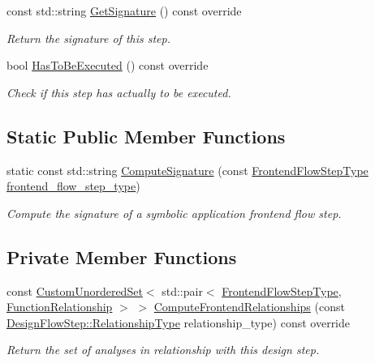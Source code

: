 \begin{DoxyCompactItemize}
const std\+::string \hyperlink{classSymbolicApplicationFrontendFlowStep_a556a719569a45bfc5f3554c1cc7558c3}{Get\+Signature} () const override
\begin{DoxyCompactList}\small\item\em Return the signature of this step. \end{DoxyCompactList}\item 
bool \hyperlink{classSymbolicApplicationFrontendFlowStep_a113fcb0dca5cdd6e2be02252be23b0e7}{Has\+To\+Be\+Executed} () const override
\begin{DoxyCompactList}\small\item\em Check if this step has actually to be executed. \end{DoxyCompactList}\end{DoxyCompactItemize}
\subsection*{Static Public Member Functions}
\begin{DoxyCompactItemize}
\item 
static const std\+::string \hyperlink{classSymbolicApplicationFrontendFlowStep_aedd0e776b99f86abc0f35695c0a423a3}{Compute\+Signature} (const \hyperlink{frontend__flow__step_8hpp_afeb3716c693d2b2e4ed3e6d04c3b63bb}{Frontend\+Flow\+Step\+Type} \hyperlink{classFrontendFlowStep_ad49067d6a17119d47316149ab757b60d}{frontend\+\_\+flow\+\_\+step\+\_\+type})
\begin{DoxyCompactList}\small\item\em Compute the signature of a symbolic application frontend flow step. \end{DoxyCompactList}\end{DoxyCompactItemize}
\subsection*{Private Member Functions}
\begin{DoxyCompactItemize}
\item 
const \hyperlink{classCustomUnorderedSet}{Custom\+Unordered\+Set}$<$ std\+::pair$<$ \hyperlink{frontend__flow__step_8hpp_afeb3716c693d2b2e4ed3e6d04c3b63bb}{Frontend\+Flow\+Step\+Type}, \hyperlink{classFrontendFlowStep_af7cf30f2023e5b99e637dc2058289ab0}{Function\+Relationship} $>$ $>$ \hyperlink{classSymbolicApplicationFrontendFlowStep_a22caf3d46c83bf130e8134d592377130}{Compute\+Frontend\+Relationships} (const \hyperlink{classDesignFlowStep_a723a3baf19ff2ceb77bc13e099d0b1b7}{Design\+Flow\+Step\+::\+Relationship\+Type} relationship\+\_\+type) const override
\begin{DoxyCompactList}\small\item\em Return the set of analyses in relationship with this design step. \end{DoxyCompactList}\end{DoxyCompactItemize}
